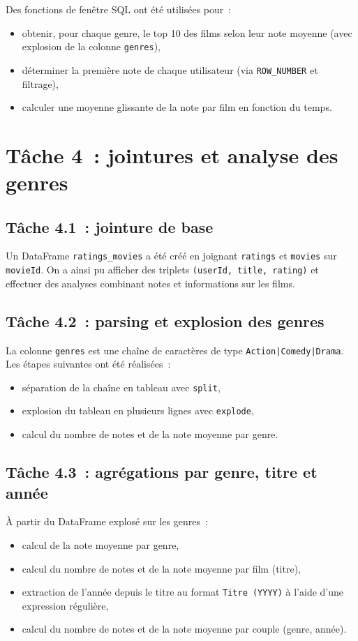 \documentclass[a4paper,11pt]{article}
\begin{document}
Des fonctions de fenêtre SQL ont été utilisées pour~:
\begin{itemize}
  \item obtenir, pour chaque genre, le top 10 des films selon leur
        note moyenne (avec explosion de la colonne \texttt{genres}),
  \item déterminer la première note de chaque utilisateur
        (via \texttt{ROW\_NUMBER} et filtrage),
  \item calculer une moyenne glissante de la note par film en fonction
        du temps.
\end{itemize}

\section{Tâche 4~: jointures et analyse des genres}

\subsection{Tâche 4.1~: jointure de base}

Un DataFrame \texttt{ratings\_movies} a été créé en joignant
\texttt{ratings} et \texttt{movies} sur \texttt{movieId}. On a
ainsi pu afficher des triplets \texttt{(userId, title, rating)}
et effectuer des analyses combinant notes et informations sur
les films.

\subsection{Tâche 4.2~: parsing et explosion des genres}

La colonne \texttt{genres} est une chaîne de caractères de type
\texttt{Action|Comedy|Drama}. Les étapes suivantes ont été réalisées~:
\begin{itemize}
  \item séparation de la chaîne en tableau avec \texttt{split},
  \item explosion du tableau en plusieurs lignes avec \texttt{explode},
  \item calcul du nombre de notes et de la note moyenne par genre.
\end{itemize}

\subsection{Tâche 4.3~: agrégations par genre, titre et année}

À partir du DataFrame explosé sur les genres~:
\begin{itemize}
  \item calcul de la note moyenne par genre,
  \item calcul du nombre de notes et de la note moyenne par film
        (titre),
  \item extraction de l'année depuis le titre au format
        \texttt{Titre (YYYY)} à l'aide d'une expression régulière,
  \item calcul du nombre de notes et de la note moyenne par
        couple (genre, année).
\end{itemize}
\end{document}
